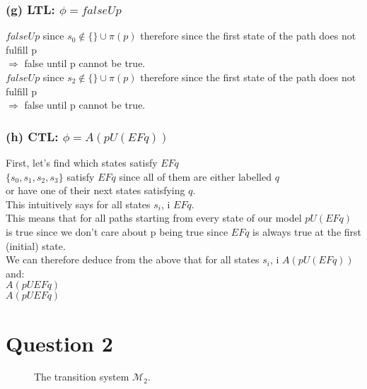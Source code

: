 \documentclass[a4paper]{article}
\begin{document}
\subsubsection*{(g) LTL: $\phi = falseUp$}
 $falseUp$
since $s_0 \not\in \{ \} \cup \pi(p)$ therefore since the first state of the path does not fulfill p \\[0.25cm] $\Rightarrow$ false until p cannot be true.\\[0.25cm]
 $falseUp$
since $s_2 \not\in \{ \} \cup \pi(p)$ therefore since the first state of the path does not fulfill p \\[0.25cm] $\Rightarrow$ false until p cannot be true.
\subsubsection*{(h) CTL: $\phi = A(pU(EFq))$}
First, let's find which states satisfy $EFq$ \\[0.25cm]
$\{s_0,s_1,s_2,s_3\}$ satisfy $EFq$ since all of them are either labelled $q$ \\[0.25cm]
or have one of their next states satisfying $q$.\\[0.25cm]
This intuitively says for all  states $s_i$, \holds i $EFq$. \\[0.25cm]
This means that for all paths starting from every state of our model $pU(EFq)$ is true since we don't care about p being true since $EFq$ is always true at the first (initial) state. \\[0.25cm]
We can therefore deduce from the above that for all states $s_i$, \holds i  $A(pU(EFq))$ and: \\[0.25cm]
 $A(pUEFq)$ \\[0.25cm]
 $A(pUEFq)$

\newpage
\section*{Question 2}
\begin{figure}[H]
  \centering
  \caption{The transition system $\mathcal{M}_2$.}
  \label{fig:m2}
\end{figure}
\end{document}
